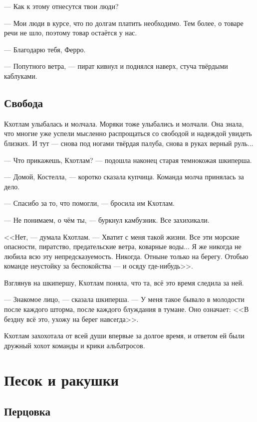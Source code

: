 --- Как к этому отнесутся твои люди?

--- Мои люди в курсе, что по долгам платить необходимо.
Тем более, о товаре речи не шло, поэтому товар остаётся у нас.

--- Благодарю тебя, Ферро.

--- Попутного ветра, --- пират кивнул и поднялся наверх, стуча твёрдыми каблуками.

\section{Свобода}

Кхотлам улыбалась и молчала.
Моряки тоже улыбались и молчали.
Она знала, что многие уже успели мысленно распрощаться со свободой и надеждой увидеть близких.
И тут --- снова под ногами твёрдая палуба, снова в руках верный руль...

--- Что прикажешь, Кхотлам? --- подошла наконец старая темнокожая шкиперша.

--- Домой, Костелла, --- коротко сказала купчица.
Команда молча принялась за дело.

--- Спасибо за то, что помогли, --- бросила им Кхотлам.

--- Не понимаем, о чём ты, --- буркнул камбузник.
Все захихикали.

<<Нет, --- думала Кхотлам.
--- Хватит с меня такой жизни.
Все эти морские опасности, пиратство, предательские ветра, коварные воды...
Я же никогда не любила всю эту непредсказуемость.
Никогда.
Отныне только на берегу.
Отобью команде неустойку за беспокойства --- и осяду где-нибудь>>.

Взглянув на шкипершу, Кхотлам поняла, что та, всё это время следила за ней.

--- Знакомое лицо, --- сказала шкиперша.
--- У меня такое бывало в молодости после каждого шторма, после каждого блуждания в тумане.
Оно означает: <<В бездну всё это, ухожу на берег навсегда>>.

Кхотлам захохотала от всей души впервые за долгое время, и ответом ей были дружный хохот команды и крики альбатросов.

\chapter{Песок и ракушки}

\section{Перцовка}

